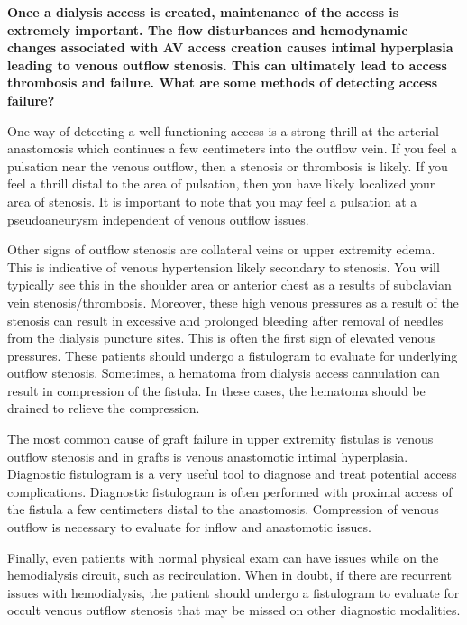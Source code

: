 \documentclass[
]{book}
\begin{document}
\textbf{Once a dialysis access is created, maintenance of the access is
extremely important. The flow disturbances and hemodynamic changes
associated with AV access creation causes intimal hyperplasia leading to
venous outflow stenosis. This can ultimately lead to access thrombosis
and failure. What are some methods of detecting access failure?}

One way of detecting a well functioning access is a strong thrill at the
arterial anastomosis which continues a few centimeters into the outflow
vein. If you feel a pulsation near the venous outflow, then a stenosis
or thrombosis is likely. If you feel a thrill distal to the area of
pulsation, then you have likely localized your area of stenosis. It is
important to note that you may feel a pulsation at a pseudoaneurysm
independent of venous outflow issues.

Other signs of outflow stenosis are collateral veins or upper extremity
edema.\citep{padberg2008} This is indicative of venous hypertension likely
secondary to stenosis. You will typically see this in the shoulder area
or anterior chest as a results of subclavian vein stenosis/thrombosis.
Moreover, these high venous pressures as a result of the stenosis can
result in excessive and prolonged bleeding after removal of needles from
the dialysis puncture sites. This is often the first sign of elevated
venous pressures. These patients should undergo a fistulogram to
evaluate for underlying outflow stenosis.\citep{caromonroig2018} Sometimes, a
hematoma from dialysis access cannulation can result in compression of
the fistula. In these cases, the hematoma should be drained to relieve
the compression.

The most common cause of graft failure in upper extremity fistulas is
venous outflow stenosis and in grafts is venous anastomotic intimal
hyperplasia.\citep{berman2001, padberg2008} Diagnostic fistulogram is a very
useful tool to diagnose and treat potential access complications.
Diagnostic fistulogram is often performed with proximal access of the
fistula a few centimeters distal to the anastomosis. Compression of
venous outflow is necessary to evaluate for inflow and anastomotic
issues.\citep{bountouris2018}

Finally, even patients with normal physical exam can have issues while
on the hemodialysis circuit, such as recirculation. When in doubt, if
there are recurrent issues with hemodialysis, the patient should undergo
a fistulogram to evaluate for occult venous outflow stenosis that may be
missed on other diagnostic modalities.\citep{sidawy2008}
\end{document}
